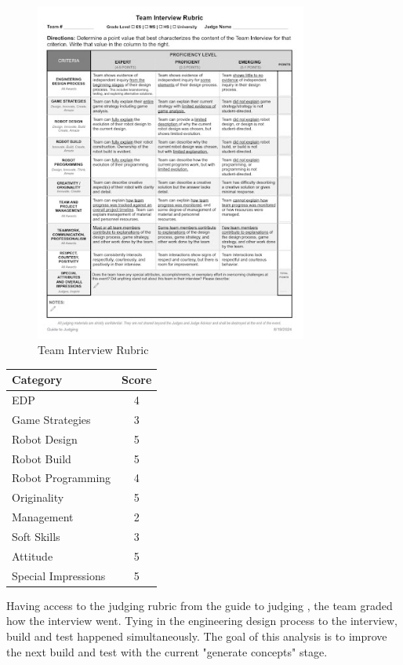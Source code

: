 \begin{figure}[h!]
    \centering
    \includegraphics[width=0.8\textwidth]{images/teaminterviewrubric}
    \caption{Team Interview Rubric}
    \label{fig:team-interview-rubric}
\end{figure}

\begin{center}
\begin{tabular}{|l|c|}
\hline
\textbf{Category} & \textbf{Score} \\
\hline
EDP & 4 \\
Game Strategies & 3 \\
Robot Design & 5 \\
Robot Build & 5 \\
Robot Programming & 4 \\
Originality & 5 \\
Management & 2 \\
Soft Skills & 3 \\
Attitude & 5 \\
Special Impressions & 5 \\
\hline
\end{tabular}
\end{center}

Having access to the judging rubric from the guide to judging \cite{rubricForJudgingInterviews}, the team graded how the interview went. Tying in the engineering design process to the interview, build and test happened simultaneously. The goal of this analysis is to improve the next build and test with the current "generate concepts" stage.

